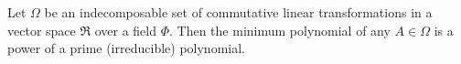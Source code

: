 Let $\Omega$ be an indecomposable set of commutative linear transformations in a vector space $\Re$ over a field $\Phi$. Then the minimum polynomial of any $A \in \Omega$ is a power of a prime (irreducible) polynomial.
